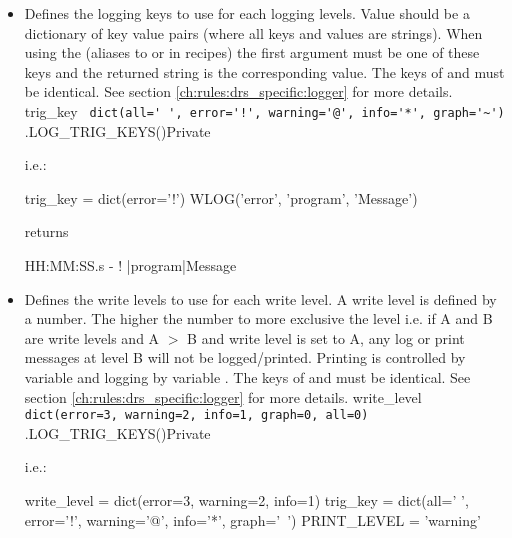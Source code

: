 \begin{itemize}
\ifdevguide
\item 
\begin{minipage}[t]{\textwidth}
{Defines the logging keys to use for each logging levels. Value should be a dictionary of key value pairs (where all keys and values are strings). When using the  (aliases to  or  in recipes) the first argument must be one of these keys and the returned string is the corresponding value. The keys of  and  must be identical.  See section \ref{ch:rules:drs_specific:logger} for more details.}
{trig\_key}
{\lstinline[style=pythoninline]| dict(all=' ', error='!', warning='@', info='*', graph='~') |}
{\AllRecipes}{\spirouCONST.LOG\_TRIG\_KEYS()}{\AllRecipes}{Private}
\vspace{-0.25cm}
\begin{thighlight}
i.e.: 
\begin{pythonbox}
trig_key = dict(error='!')
WLOG('error', 'program', 'Message')
\end{pythonbox}
returns
\begin{cmdboxprint}
HH:MM:SS.s - ! |program|Message
\end{cmdboxprint}
\end{thighlight}
\end{minipage}
\fi

\ifdevguide
\item 
\begin{minipage}[t]{\textwidth}
{Defines the write levels to use for each write level. A write level is defined by a number. The higher the number to more exclusive the level i.e. if A and B are write levels and A $>$ B and write level is set to A, any log or print messages at level B will not be logged/printed. Printing is controlled by variable  and logging by variable . The keys of  and  must be identical. See section \ref{ch:rules:drs_specific:logger} for more details.}
{write\_level}
{\lstinline[style=pythoninline]| dict(error=3, warning=2, info=1, graph=0, all=0) |}
{\AllRecipes}{\spirouCONST.LOG\_TRIG\_KEYS()}{\AllRecipes}{Private}
\vspace{-0.25cm}
\begin{thighlight}
i.e.: 
\begin{pythonbox}
write_level = dict(error=3, warning=2, info=1)
trig_key = dict(all=' ', error='!', warning='@', info='*', graph='~')
PRINT_LEVEL = 'warning'


\end{pythonbox}
\end{thighlight}
\end{minipage}
\end{itemize}
